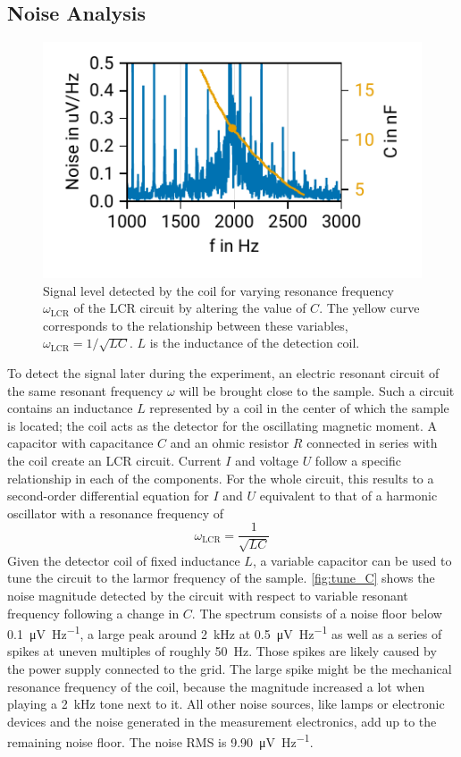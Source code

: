 \documentclass[
    parskip=half, 
    twoside=false,
    twocolumn=true,
    fontsize=11pt,
]{scrarticle}
\begin{document}
\subsection{Noise Analysis}
\begin{figure}
    \centering
    \label{fig:tune_C}
    \includegraphics{figures/01 noise.pdf}
    \caption{Signal level detected by the coil for varying resonance frequency $\omega_{\text{LCR}}$ of the LCR circuit by altering the value of $C$. The yellow curve corresponds to the relationship between these variables, $\omega_{\text{LCR}} = 1/\sqrt{LC}$. $L$ is the inductance of the detection coil.}
\end{figure}

To detect the signal later during the experiment, an electric resonant circuit of the same resonant frequency $\omega$ will be brought close to the sample. Such a circuit contains an inductance $L$ represented by a coil in the center of which the sample is located; the coil acts as the detector for the oscillating magnetic moment. A capacitor with capacitance $C$ and an ohmic resistor $R$ connected in series with the coil create an LCR circuit. Current $I$ and voltage $U$ follow a specific relationship in each of the components. For the whole circuit, this results to a second-order differential equation for $I$ and $U$ equivalent to that of a harmonic oscillator with a resonance frequency of
\begin{equation}
 \label{eq:LCR_frequency}
 \omega_{\text{LCR}} = \frac{1}{\sqrt{LC}}
\end{equation}
Given the detector coil of fixed inductance $L$, a variable capacitor can be used to tune the circuit to the larmor frequency of the sample. \autoref{fig:tune_C} shows the noise magnitude detected by the circuit with respect to variable resonant frequency following a change in $C$. The spectrum consists of a noise floor below \SI{0.1}{\micro \volt \per \hertz}, a large peak around \SI{2}{\kilo \hertz} at \SI{0.5}{\micro \volt \per \hertz} as well as a series of spikes at uneven multiples of roughly \SI{50}{\hertz}. Those spikes are likely caused by the power supply connected to the grid. The large spike might be the mechanical resonance frequency of the coil, because the magnitude increased a lot when playing a \SI{2}{\kilo \hertz} tone next to it. All other noise sources, like lamps or electronic devices and the noise generated in the measurement electronics, add up to the remaining noise floor.
The noise RMS is \SI{9.90}{\micro \volt \per \hertz}.
\end{document}
